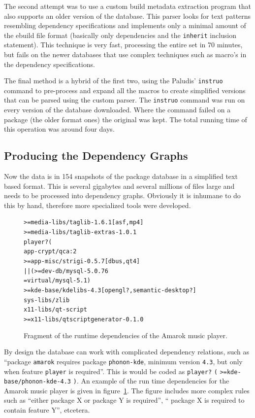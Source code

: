 \documentclass[smallextended,final]{svjour3}
\begin{document}
The second attempt was to use a custom build metadata extraction program that also supports an older version of the database. This parser looks for text patterns resembling dependency specifications and implements only a minimal amount of the ebuild file format (basically only dependencies and the \verb|inherit| inclusion statement). This technique is very fast, processing the entire set in 70 minutes, but fails on the newer databases that use complex techniques such as macro's in the dependency specifications.

The final method is a hybrid of the first two, using the Paludis' \verb|instruo| command to pre-process and expand all the macros to create simplified versions that can be parsed using the custom parser. The \verb|instruo| command was run on every version of the database downloaded. Where the command failed on a package (the older format ones) the original was kept. The total running time of this operation was around four days.

\subsection{Producing the Dependency Graphs}

Now the data is in 154 snapshots of the package database in a simplified text based format. This is several gigabytes and several millions of files large and needs to be processed into dependency graphs. Obviously it is inhumane to do this by hand, therefore more specialized tools were developed.

\begin{figure}[t]
\small\centering
\begin{alltt}
>=media-libs/taglib-1.6.1[asf,mp4]
>=media-libs/taglib-extras-1.0.1
player? (
    app-crypt/qca:2
    >=app-misc/strigi-0.5.7[dbus,qt4]
    || ( >=dev-db/mysql-5.0.76
         =virtual/mysql-5.1 )
    >=kde-base/kdelibs-4.3[opengl?,semantic-desktop?]
    sys-libs/zlib
    x11-libs/qt-script
    >=x11-libs/qtscriptgenerator-0.1.0
\end{alltt}
\vspace{-1em}
\caption{Fragment of the runtime dependencies of the Amarok music player.}\label{fig:amarokruntime}
\vspace{-2em}
\end{figure}

By design the database can work with complicated dependency relations, such as ``package \verb|amarok| requires package \verb|phonon-kde|, minimum version \verb|4.3|, but only when feature \verb|player| is required''. This is would be coded as \verb|player?| \verb|(| \verb|>=kde-base/phonon-kde-4.3| \verb|)|. An example of the run time dependencies for the Amarok music player is given in figure~\ref{fig:amarokruntime}. The figure includes more complex rules such as ``either package X or package Y is required'', `` package X is required to contain feature Y'', etcetera.
\end{document}
